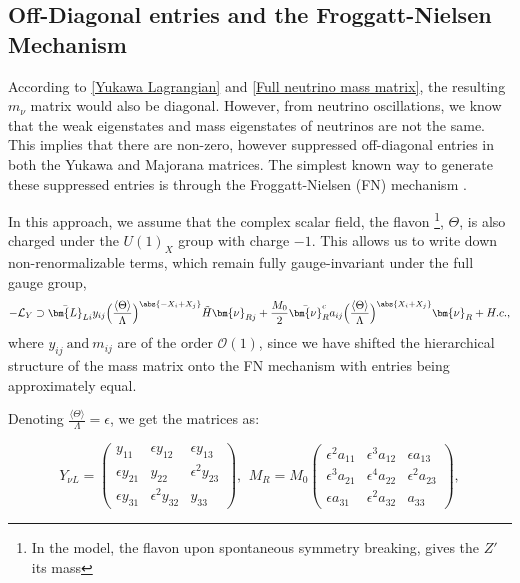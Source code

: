 \subsection{Off-Diagonal entries and the Froggatt-Nielsen Mechanism}
According to \cref{Yukawa Lagrangian} and \cref{Full neutrino mass matrix}, the resulting $m_\nu$ matrix would also be diagonal. However, from neutrino oscillations, we know that the weak eigenstates and mass eigenstates of neutrinos are not the same. This implies that there are non-zero, however suppressed off-diagonal entries in both the Yukawa and Majorana matrices. The simplest known way to generate these suppressed entries is through the Froggatt-Nielsen (FN) mechanism \cite{froggatt_hierarchy_1979}. 

In this approach, we assume that the complex scalar field, the flavon \footnote{In the model, the flavon upon spontaneous symmetry breaking, gives the $Z'$ its mass}, $\Theta$, is also charged under the $U(1)_X$ group with charge $-1$. This allows us to write down non-renormalizable terms, which remain fully gauge-invariant under the full gauge group,
\begin{equation} \label{Yukawa Lagrangian FN}
    \small
    -\mathcal{L}_Y  \supset  \Bar{\bm{L}}_{L i} y_{ ij} \Big( \frac{\langle\Theta\rangle}{\Lambda}\Big)^\abs{-X_i + X_j} \Tilde{H} \bm{\nu}_{R j}  +  \frac{M_0}{2}  \Bar{\bm{\nu}}_R^c a_{ij}  \Big( \frac{\langle\Theta\rangle}{\Lambda}\Big)^\abs{X_i + X_j} \bm{\nu}_R + H.c.,
\end{equation}
where $y_{ij} \ \text{and} \ m_{ij}$ are of the order $\mathcal{O}(1)$, since we have shifted the hierarchical structure of the mass matrix onto the FN mechanism with entries being approximately equal.

Denoting $\frac{\langle\Theta\rangle}{\Lambda} = \epsilon$, we get the matrices as:

\begin{equation} \label{FN Y and M}
    Y_{\nu L} = 
    \begin{pmatrix}
        y_{11} &\epsilon y_{12} & \epsilon y_{13} \\
        \epsilon y_{21}&y_{22}&\epsilon^{2}y_{23}\\
        \epsilon y_{31}& \epsilon^{2}y_{32}&y_{33}
    \end{pmatrix}, \,\ 
    M_R = M_0
    \begin{pmatrix}
    \epsilon^{2}a_{11}&\epsilon^{3}a_{12}&\epsilon a_{13}\\
    
    \epsilon^{3} a_{21} & \epsilon^{4} a_{22}& \epsilon^{2} a_{23}\\
    
    \epsilon a_{31} & \epsilon^{2}a_{32}&a_{33} 
    \end{pmatrix},
\end{equation}

